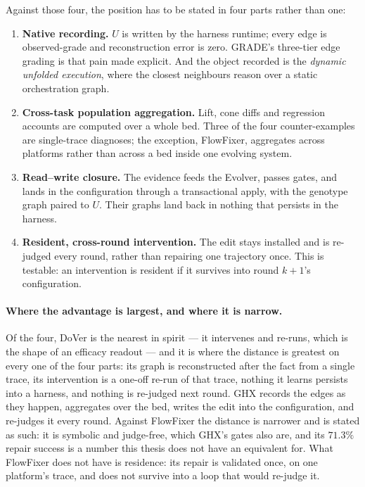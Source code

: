 Against those four, the position has to be stated in four parts rather than
one:

\begin{enumerate}
  \item \textbf{Native recording.} $U$ is written by the harness runtime;
        every edge is observed-grade and reconstruction error is zero.
        GRADE's three-tier edge grading is that pain made explicit. And the
        object recorded is the \emph{dynamic unfolded execution}, where the
        closest neighbours reason over a static orchestration graph.
  \item \textbf{Cross-task population aggregation.} Lift, cone diffs and
        regression accounts are computed over a whole bed. Three of the
        four counter-examples are single-trace diagnoses; the exception,
        FlowFixer, aggregates across platforms rather than across a bed
        inside one evolving system.
  \item \textbf{Read--write closure.} The evidence feeds the Evolver,
        passes gates, and lands in the configuration through a
        transactional apply, with the genotype graph paired to $U$. Their
        graphs land back in nothing that persists in the harness.
  \item \textbf{Resident, cross-round intervention.} The edit stays
        installed and is re-judged every round, rather than repairing one
        trajectory once. This is testable: an intervention is resident if
        it survives into round $k{+}1$'s configuration.
\end{enumerate}

\paragraph{Where the advantage is largest, and where it is narrow.} Of the
four, DoVer is the nearest in spirit --- it intervenes and re-runs, which
is the shape of an efficacy readout --- and it is where the distance is
greatest on every one of the four parts: its graph is reconstructed after
the fact from a single trace, its intervention is a one-off re-run of that
trace, nothing it learns persists into a harness, and nothing is
re-judged next round. GHX records the edges as they happen, aggregates
over the bed, writes the edit into the configuration, and re-judges it
every round. Against FlowFixer the distance is narrower and is stated as
such: it is symbolic and judge-free, which GHX's gates also are, and its
$71.3\%$ repair success is a number this thesis does not have an
equivalent for. What FlowFixer does not have is residence: its repair is
validated once, on one platform's trace, and does not survive into a
loop that would re-judge it.

